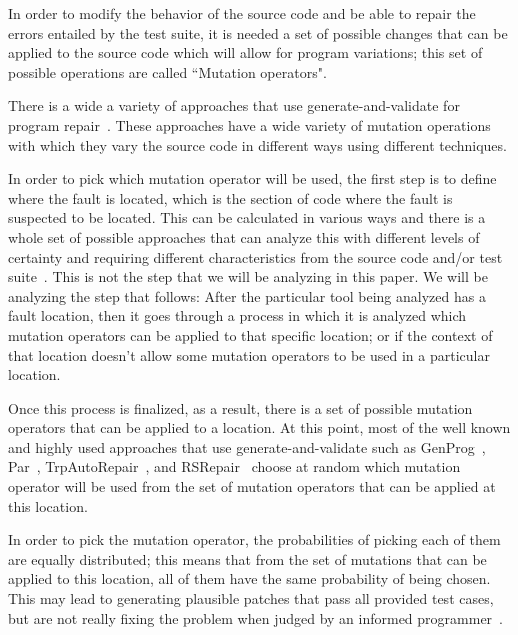 \documentclass[conference]{IEEEtran}
\newcommand{\todo}[1]
  {{\scriptsize \textbf{\color{red} {#1}}}}
\begin{document}
In order to modify the behavior of the source code and be able to repair the 
errors entailed by the test suite, it is needed a set of possible changes that 
can be applied to the source code which will allow for program variations; this 
set of possible operations are called ``Mutation operators". 

There is a wide a variety of approaches that use generate-and-validate for 
program 
repair~\cite{legoues12,kim2013,Weimer13,fan15,long15,debroy10,perkins09,wei10}. 
These approaches 
have a wide variety of mutation operations with which they vary the source code 
in different ways using different techniques. 

In
order to pick which mutation operator will be used, the 
first step is to define where the fault is located, which is the section of code 
where the
fault is suspected to be located. This can be calculated in various ways and 
there is 
a whole set of
possible approaches that can analyze this with different levels of certainty and 
requiring different characteristics from the source code and/or test 
suite~\cite{Jones05,Jones02,Chen02,legoues12,Qi13,Qi2013,Abreu07,wong09}. This is not the 
step that we will be analyzing in this
paper. We will be analyzing the step that follows: After the particular tool 
being analyzed has a fault location, then
it goes through a process in which it is analyzed which mutation operators can
be applied to that specific location; or if the context of that location doesn't
allow some mutation operators to be used in a particular location. 

Once this process is finalized, as a result, there is a set of possible 
mutation operators that
can be applied to a location. At this point, most of the well known and highly 
used approaches that use generate-and-validate such as GenProg~\cite{legoues12}, 
Par~\cite{kim2013}, TrpAutoRepair~\cite{Qi13}, and RSRepair~\cite{Qi14} 
choose at random which mutation operator will be used from the set of mutation 
operators that can be applied at this location. 



In order to pick the mutation operator, the probabilities of picking each of
them are equally distributed; this means that from the set of mutations that can 
be applied to this location, all of them have the same probability of being 
chosen. This may lead to generating plausible patches that pass all provided 
test cases, but are not really fixing the problem when judged by an informed 
programmer~\cite{Qi15, kim2013}. 
\end{document}
